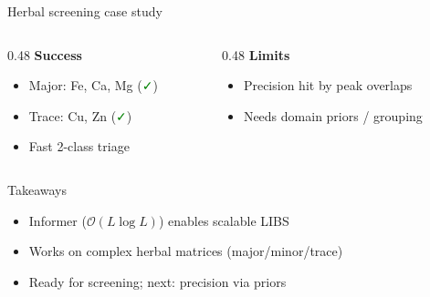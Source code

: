\documentclass{beamer}
\begin{document}
\begin{frame}{Herbal screening case study}
  \begin{columns}[T]
    \begin{column}{0.48\textwidth}
      \textbf{Success}
      \begin{itemize}
        \item Major: Fe, Ca, Mg (\textcolor{green}{✓})
        \item Trace: Cu, Zn (\textcolor{green}{✓})
        \item Fast 2-class triage
      \end{itemize}
    \end{column}
    \begin{column}{0.48\textwidth}
      \textbf{Limits}
      \begin{itemize}
        \item Precision hit by peak overlaps
        \item Needs domain priors / grouping
      \end{itemize}
    \end{column}
  \end{columns}
\end{frame}

\begin{frame}{Takeaways}
  \begin{itemize}
    \item Informer (\(\mathcal O(L\log L)\)) enables scalable LIBS
    \item Works on complex herbal matrices (major/minor/trace)
    \item Ready for screening; next: precision via priors
  \end{itemize}
\end{frame}
\end{document}
